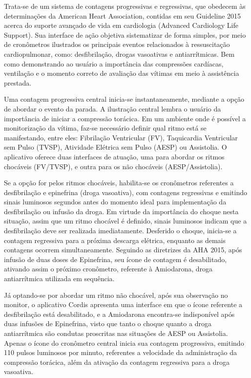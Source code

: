 \documentclass[twoside,twocolumn]{article}
\begin{document}
Trata-se de um sistema de contagens progressivas e regressivas, que obedecem às determinações da American Heart Association, contidas em seu Guideline 2015 acerca do suporte avançado de vida em cardiologia (Advanced Cardiology Life Support). 
Sua interface de ação objetiva sistematizar de forma simples, por meio de cronômetros ilustrados os principais eventos relacionados à ressuscitação cardiopulmonar, como: desfibrilação, drogas vasoativas e antiarrítmicas. Bem como demonstrando ao usuário a importância das compressões cardíacas, ventilação e o momento correto de avaliação das vítimas em meio à assistência prestada.

Uma contagem progressiva central inicia-se instantaneamente, mediante a opção de abordar o evento da parada. A ilustração central lembra o usuário da importância de iniciar a compressão torácica. Em um ambiente onde é possível a monitorização da vítima, faz-se necessário definir qual ritmo está se manifestando, entre eles: Fibrilação Ventricular (FV), Taquicardia Ventricular sem Pulso (TVSP), Atividade Elétrica sem Pulso (AESP) ou Assistolia. O aplicativo oferece duas interfaces de atuação, uma para abordar os ritmos chocáveis (FV/TVSP), e outra para os não chocáveis (AESP/Assistolia).

Se a opção for pelos ritmos chocáveis, habilita-se os cronômetros referentes a desfibrilação e epinefrina (droga vasoativa), com contagens regressivas e emitindo sinais luminosos segundos antes do momento ideal para implementação da desfibrilação ou infusão da droga. Em virtude da importância do choque nesta situação, assim que um ritmo chocável é definido, sinais luminosos indicam que a desfibrilação deve ser realizada imediatamente. Desferido o choque, inicia-se a contagem regressiva para a próxima descarga elétrica, enquanto as demais contagens ocorrem simultaneamente. Seguindo as diretrizes da AHA 2015, após infusão de duas doses de Epinefrina, seu ícone de contagem é desabilitado, ativando assim o próximo cronômetro, referente à Amiodarona, droga antiarrítmica utilizada em sequência. 

Já optando-se por abordar um ritmo não chocável, após sua observação no monitor, o aplicativo Cordis apresenta uma interface em que o ícone referente a desfibrilação está desabilitado, e a Amiodarona encontra-se indisponível após duas infusões de Epinefrina, visto que tanto o choque quanto a droga antiarrítmica são condutas proscritas nas situações de AESP ou Assistolia. Apenas o ícone do cronômetro central inicia sua contagem progressiva, emitindo 110 pulsos luminosos por minuto, referentes a velocidade da administração da compressão torácica, além da ativação da contagem regressiva para a droga vasoativa. 
\end{document}
